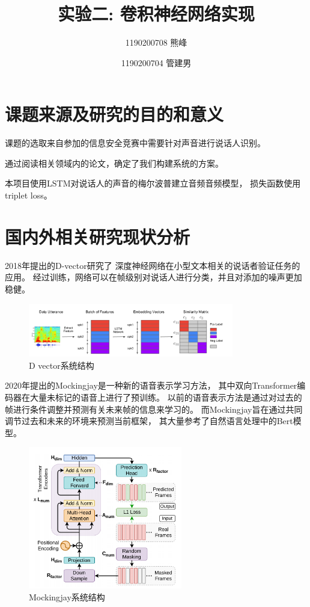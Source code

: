 \documentclass{article}
\title{实验二: 卷积神经网络实现}
\author{
    1190200708 熊峰\\
    \and
    1190200704 管建男\\
}
\date{}
\begin{document}
\maketitle


\section{课题来源及研究的目的和意义}

课题的选取来自参加的信息安全竞赛中需要针对声音进行说话人识别。

通过阅读相关领域内的论文，确定了我们构建系统的方案。

本项目使用LSTM对说话人的声音的梅尔波普建立音频音频模型，
损失函数使用triplet loss\cite{schroff2015facenet}。

\section{国内外相关研究现状分析}

2018年提出的D-vector\cite{wan2018generalized}研究了
深度神经网络在小型文本相关的说话者验证任务的应用。
经过训练，网络可以在帧级别对说话人进行分类，并且对添加的噪声更加稳健。

\begin{figure}[H]
    \centering
    \includegraphics[width=0.8\textwidth]{figures/dvector-overview.png}
    \caption{D vector系统结构}
\end{figure}

2020年提出的Mockingjay\cite{liu2020mockingjay}是一种新的语音表示学习方法，
其中双向Transformer编码器在大量未标记的语音上进行了预训练。
以前的语音表示方法是通过对过去的帧进行条件调整并预测有关未来帧的信息来学习的。
而Mockingjay旨在通过共同调节过去和未来的环境来预测当前框架，
其大量参考了自然语言处理中的Bert模型\cite{devlin2018bert}。

\begin{figure}[H]
    \centering
    \includegraphics[width=0.6\textwidth]{figures/mockingjay-overview.png}
    \caption{Mockingjay系统结构}
\end{figure}
\end{document}
